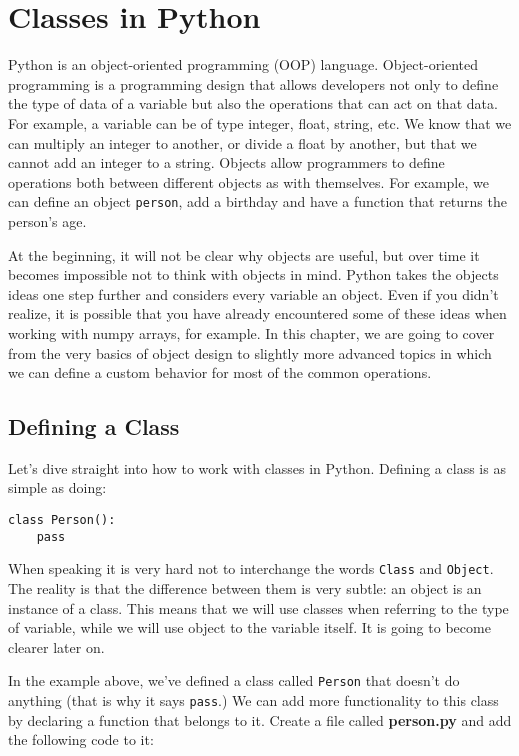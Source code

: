 \chapter{Classes in Python}\label{chapter:classes-in-python}
Python is an object-oriented programming (OOP) language. Object-oriented
programming is a programming design that allows developers not only to
define the type of data of a variable but also the operations that can
act on that data. For example, a variable can be of type integer, float,
string, etc. We know that we can multiply an integer to another, or
divide a float by another, but that we cannot add an integer to a
string. Objects allow programmers to define operations both between
different objects as with themselves. For example, we can define an object
\texttt{person}, add a birthday and have a function that returns the
person's age.

At the beginning, it will not be clear why objects are useful, but over
time it becomes impossible not to think with objects in mind. Python
takes the objects ideas one step further and considers every variable
an object. Even if you didn't realize, it is possible that you have
already encountered some of these ideas when working with numpy arrays,
for example. In this chapter, we are going to cover from the very basics
of object design to slightly more advanced topics in which we can define a 
custom behavior for most of the common operations.

\section{Defining a Class}\label{defining-a-class}
Let's dive straight into how to work with classes in Python. Defining a class is as
simple as doing:

\begin{verbatim}
class Person():
    pass
\end{verbatim}

When speaking it is very hard not to interchange the words
\texttt{Class} and \texttt{Object}. The reality is that the difference
between them is very subtle: an object is an instance of a class. This
means that we will use classes when referring to the type of variable,
while we will use object to the variable itself. It is going to become clearer
later on.

In the example above, we've defined a class called \texttt{Person} that doesn't do
anything (that is why it says \texttt{pass}.) We can add more
functionality to this class by declaring a function that belongs to it. Create a file called \textbf{person.py} and add the following code to it:

